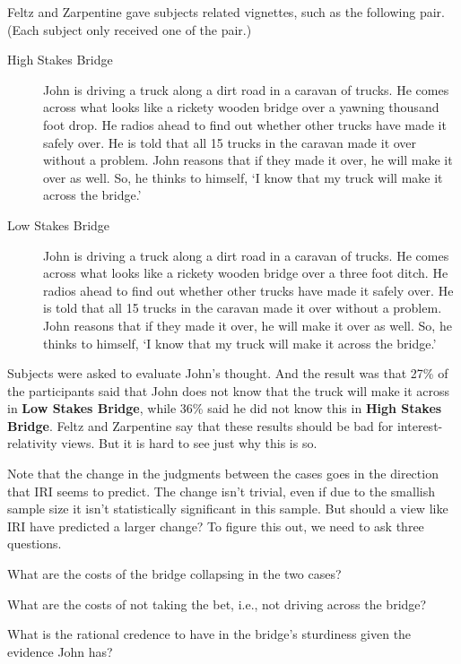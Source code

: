 \documentclass[oneside]{book}
\begin{document}
Feltz and Zarpentine gave subjects related vignettes, such as the following pair. (Each subject only received one of the pair.)

\begin{description}
\item[High Stakes Bridge] John is driving a truck along a dirt road in a caravan of trucks. He comes across what looks like a rickety wooden bridge over a yawning thousand foot drop. He radios ahead to find out whether other trucks have made it safely over. He is told that all 15 trucks in the caravan made it over without a problem. John reasons that if they made it over, he will make it over as well. So, he thinks to himself, `I know that my truck will make it across the bridge.'

\item[Low Stakes Bridge] John is driving a truck along a dirt road in a caravan of trucks. He comes across what looks like a rickety wooden bridge over a three foot ditch. He radios ahead to find out whether other trucks have made it safely over. He is told that all 15 trucks in the caravan made it over without a problem. John reasons that if they made it over, he will make it over as well. So, he thinks to himself, `I know that my truck will make it across the bridge.' \citep[??]{FeltzZarpentine2010}
\end{description}

\noindent Subjects were asked to evaluate John's thought. And the result was that 27\% of the participants said that John does not know that the truck will make it across in \textbf{Low Stakes Bridge}, while 36\% said he did not know this in \textbf{High Stakes Bridge}. Feltz and Zarpentine say that these results should be bad for interest-relativity views. But it is hard to see just why this is so.

Note that the change in the judgments between the cases goes in the direction that IRI seems to predict. The change isn't trivial, even if due to the smallish sample size it isn't statistically significant in this sample. But should a view like IRI have predicted a larger change? To figure this out, we need to ask three questions.

\begin{enumerate*}
\item What are the costs of the bridge collapsing in the two cases?
\item What are the costs of not taking the bet, i.e., not driving across the bridge?
\item What is the rational credence to have in the bridge's sturdiness given the evidence John has?
\end{enumerate*}
\end{document}
